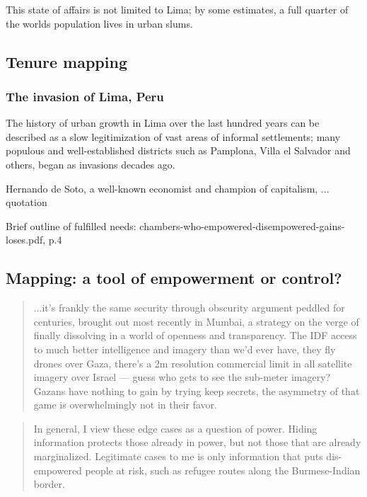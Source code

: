 \documentclass[11pt]{report}
\begin{document}
This state of affairs is not limited to Lima; by some estimates, a full quarter of the worlds population lives in urban slums. 


\subsection{Tenure mapping}

\subsubsection{The invasion of Lima, Peru}

The history of urban growth in Lima over the last hundred years can be described as a slow legitimization of vast areas of informal settlements; many populous and well-established districts such as Pamplona, Villa el Salvador and others, began as invasions decades ago.

Hernando de Soto, a well-known economist and champion of capitalism, ... quotation

Brief outline of fulfilled needs: chambers-who-empowered-disempowered-gains-loses.pdf, p.4

\subsection{Mapping: a tool of empowerment or control?}

\begin{quote}
...it's frankly the same security through obscurity argument peddled for centuries, brought out most recently in Mumbai, a strategy on the verge of finally dissolving in a world of openness and transparency. The IDF access to much better intelligence and imagery than we'd ever have, they fly drones over Gaza, there's a 2m resolution commercial limit in all satellite imagery over Israel — guess who gets to see the sub-meter imagery? Gazans have nothing to gain by trying keep secrets, the asymmetry of that game is overwhelmingly not in their favor.\cite{maron2009misconceptions}
\end{quote}

\begin{quote}
In general, I view these edge cases as a question of power. Hiding information protects those already in power, but not those that are already marginalized. Legitimate cases to me is only information that puts dis-empowered people at risk, such as refugee routes along the Burmese-Indian border.\cite{maron2010freedom}
\end{quote}
\end{document}
